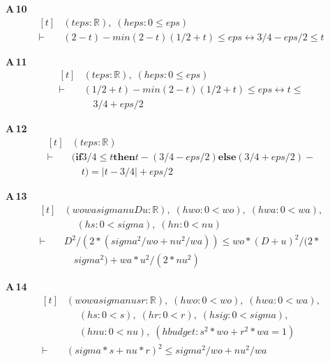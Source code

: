 \noindent\textbf{A\,10}\quad{}
{\footnotesize\[ \begin{aligned}[t]
&(\mathit{t} \mathit{eps} : \mathbb{R} ),\; (\mathit{heps} : 0 \leq \mathit{eps})\\
\vdash\;&(2 - \mathit{t}) - \mathit{min} (2 - \mathit{t}) (1 / 2 + \mathit{t}) \leq \mathit{eps} \leftrightarrow 3 / 4 - \mathit{eps} / 2 \leq \mathit{t}
\end{aligned} \]}

\noindent\textbf{A\,11}\quad{}
{\footnotesize\[ \begin{aligned}[t]
&(\mathit{t} \mathit{eps} : \mathbb{R} ),\; (\mathit{heps} : 0 \leq \mathit{eps})\\
\vdash\;&(1 / 2 + \mathit{t}) - \mathit{min} (2 - \mathit{t}) (1 / 2 + \mathit{t}) \leq \mathit{eps} \leftrightarrow \mathit{t} \leq\\
&\quad 3 / 4 + \mathit{eps} / 2
\end{aligned} \]}

\noindent\textbf{A\,12}\quad{}
{\footnotesize\[ \begin{aligned}[t]
&(\mathit{t} \mathit{eps} : \mathbb{R} )\\
\vdash\;&(\mathbf{if} 3 / 4 \leq \mathit{t} \mathbf{then} \mathit{t} - (3 / 4 - \mathit{eps} / 2) \mathbf{else} (3 / 4 + \mathit{eps} / 2) -\\
&\quad \mathit{t}) = |\mathit{t} - 3 / 4| + \mathit{eps} / 2
\end{aligned} \]}

\noindent\textbf{A\,13}\quad{}
{\footnotesize\[ \begin{aligned}[t]
&(\mathit{wo} \mathit{wa} \mathit{sigma} \mathit{nu} \mathit{D} \mathit{u} : \mathbb{R} ),\; (\mathit{hwo} : 0 < \mathit{wo}),\; (\mathit{hwa} : 0 < \mathit{wa}),\\
&\quad \; (\mathit{hs} : 0 < \mathit{sigma}),\; (\mathit{hn} : 0 < \mathit{nu})\\
\vdash\;&\mathit{D} ^{2} / (2 * (\mathit{sigma} ^{2} / \mathit{wo} + \mathit{nu} ^{2} / \mathit{wa})) \leq \mathit{wo} * (\mathit{D} + \mathit{u}) ^{2} / (2 *\\
&\quad \mathit{sigma} ^{2}) + \mathit{wa} * \mathit{u} ^{2} / (2 * \mathit{nu} ^{2})
\end{aligned} \]}

\noindent\textbf{A\,14}\quad{}
{\footnotesize\[ \begin{aligned}[t]
&(\mathit{wo} \mathit{wa} \mathit{sigma} \mathit{nu} \mathit{s} \mathit{r} : \mathbb{R} ),\; (\mathit{hwo} : 0 < \mathit{wo}),\; (\mathit{hwa} : 0 < \mathit{wa}),\\
&\quad \; (\mathit{hs} : 0 < \mathit{s}),\; (\mathit{hr} : 0 < \mathit{r}),\; (\mathit{hsig} : 0 < \mathit{sigma}),\\
&\quad \; (\mathit{hnu} : 0 < \mathit{nu}),\; (\mathit{hbudget} : \mathit{s} ^{2} * \mathit{wo} + \mathit{r} ^{2} * \mathit{wa} = 1)\\
\vdash\;&(\mathit{sigma} * \mathit{s} + \mathit{nu} * \mathit{r}) ^{2} \leq \mathit{sigma} ^{2} / \mathit{wo} + \mathit{nu} ^{2} / \mathit{wa}
\end{aligned} \]}

